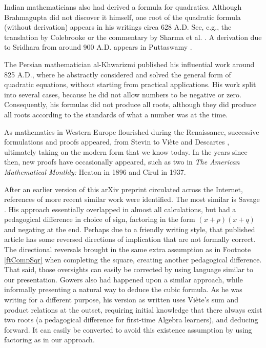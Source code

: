 Indian mathematicians also had derived a formula for quadratics. Although
Brahmagupta \cite{brahmagupta} did not discover it himself, one root of the
quadratic formula (without derivation) appears in his writings circa 628
A.D. See, e.g., the translation by Colebrooke \cite{colebrooke} or the
commentary by Sharma et al. \cite{sharma}. A derivation due to Sridhara
from around 900 A.D. appears in Puttaswamy \cite{puttaswamy}.

The Persian mathematician al-Khwarizmi published his influential work
\cite{al-khwarizmi} around 825 A.D., where he abstractly considered and
solved the general form of quadratic equations, without starting from
practical applications. His work split into several cases, because he did
not allow numbers to be negative or zero. Consequently, his formulas did
not produce all roots, although they did produce all roots according to the
standards of what a number was at the time.

As mathematics in Western Europe flourished during the Renaissance, successive
formulations and proofs appeared, from Stevin \cite{stevin} to Vi\`ete
\cite{viete} and Descartes \cite{descartes}, ultimately taking on the modern
form that we know today. In the years since then, new proofs have occasionally
appeared, such as two in \emph{The American Mathematical Monthly:} Heaton
\cite{heaton} in 1896 and Cirul \cite{cirul} in 1937.

After an earlier version of this arXiv preprint circulated across the Internet,
references of more recent similar work were identified. The most similar is
Savage \cite{savage}. His approach essentially overlapped in almost all
calculations, but had a pedagogical difference in choice of sign, factoring in
the form $(x+p)(x+q)$ and negating at the end. Perhaps due to a friendly writing
style, that published article has some reversed directions of implication that
are not formally correct. The directional reversals brought in the same extra
assumption as in Footnote \ref{ftCompSqr} when completing the square, creating
another pedagogical difference. That said, those oversights can easily be
corrected by using language similar to our presentation. Gowers \cite{gowers}
also had happened upon a similar approach, while informally presenting a natural
way to deduce the cubic formula.  As he was writing for a different purpose, his
version as written uses Vi\`ete's sum and product relations at the outset,
requiring initial knowledge that there always exist two roots (a pedagogical
difference for first-time Algebra learners), and deducing forward. It can easily
be converted to avoid this existence assumption by using factoring as in our
approach. 

